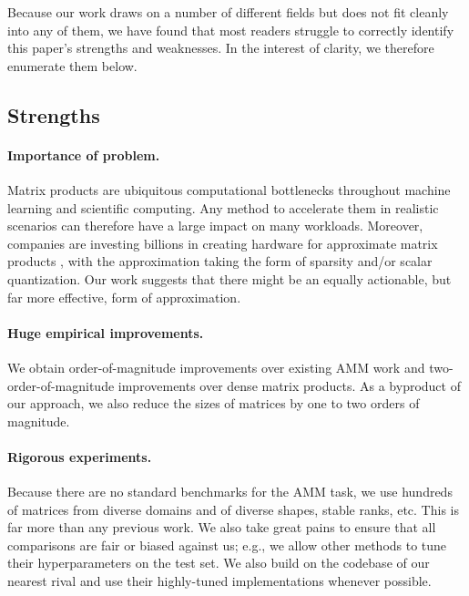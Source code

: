 


Because our work draws on a number of different fields but does not fit cleanly into any of them, we have found that most readers struggle to correctly identify this paper's strengths and weaknesses. In the interest of clarity, we therefore enumerate them below.

\subsection{Strengths}

\paragraph{Importance of problem.}
Matrix products are ubiquitous computational bottlenecks throughout machine learning and scientific computing.
Any method to accelerate them in realistic scenarios can therefore have a large impact on many workloads.
Moreover, companies are investing billions in creating hardware for approximate matrix products \cite{nvidia10k2021}, with the approximation taking the form of sparsity and/or scalar quantization. Our work suggests that there might be an equally actionable, but far more effective, form of approximation.

\paragraph{Huge empirical improvements.} We obtain order-of-magnitude improvements over existing AMM work and two-order-of-magnitude improvements over dense matrix products. As a byproduct of our approach, we also reduce the sizes of matrices by one to two orders of magnitude.

\paragraph{Rigorous experiments.}
Because there are no standard benchmarks for the AMM task, we use hundreds of matrices from diverse domains and of diverse shapes, stable ranks, etc. This is far more than any previous work. We also take great pains to ensure that all comparisons are fair or biased against us; e.g., we allow other methods to tune their hyperparameters on the test set. We also build on the codebase of our nearest rival \cite{bolt} and use their highly-tuned implementations whenever possible.

